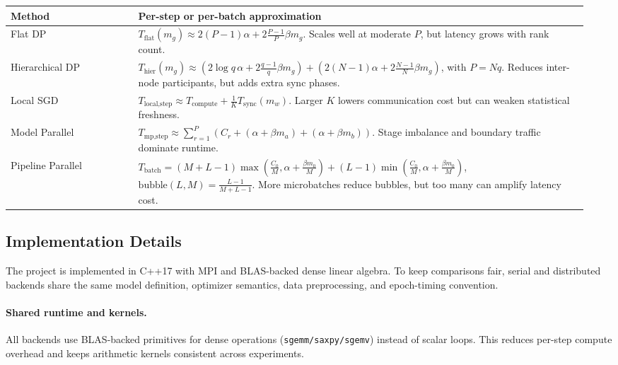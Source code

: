 \documentclass[11pt]{article}
\begin{document}
\begin{center}
\footnotesize
{}
\label{tab:alpha-beta-summary}
\begin{tabular}{p{0.21\linewidth}p{0.74\linewidth}}
\toprule
\textbf{Method} & \textbf{Per-step or per-batch approximation} \\
\midrule
Flat DP &
\(T_{\text{flat}}(m_g) \approx 2(P-1)\alpha + 2\frac{P-1}{P}\beta m_g\). Scales well at moderate \(P\), but latency grows with rank count. \\
Hierarchical DP &
\(T_{\text{hier}}(m_g) \approx \left(2\log q\,\alpha + 2\frac{q-1}{q}\beta m_g\right) + \left(2(N-1)\alpha + 2\frac{N-1}{N}\beta m_g\right)\), with \(P=Nq\). Reduces inter-node participants, but adds extra sync phases. \\
Local SGD &
\(T_{\text{local,step}} \approx T_{\text{compute}} + \frac{1}{K}T_{\text{sync}}(m_w)\). Larger \(K\) lowers communication cost but can weaken statistical freshness. \\
Model Parallel &
\(T_{\text{mp,step}} \approx \sum_{r=1}^{P}\left(C_r + (\alpha+\beta m_a) + (\alpha+\beta m_b)\right)\). Stage imbalance and boundary traffic dominate runtime. \\
Pipeline Parallel &
\(T_{\text{batch}} = (M + L - 1)\max\!\left(\frac{C_0}{M}, \alpha + \frac{\beta m_0}{M}\right) + (L - 1)\min\!\left(\frac{C_0}{M}, \alpha + \frac{\beta m_0}{M}\right)\), \(\text{bubble}(L,M)=\frac{L-1}{M+L-1}\). More microbatches reduce bubbles, but too many can amplify latency cost. \\
\bottomrule
\end{tabular}
\end{center}

\subsection{Implementation Details}
\label{sec:impl}
The project is implemented in C++17 with MPI and BLAS-backed dense linear
algebra. To keep comparisons fair, serial and distributed backends share the
same model definition, optimizer semantics, data preprocessing, and epoch-timing
convention.

\paragraph{Shared runtime and kernels.}
All backends use BLAS-backed primitives for dense operations
(\texttt{sgemm/saxpy/sgemv}) instead of scalar loops. This reduces per-step
compute overhead and keeps arithmetic kernels consistent across experiments.
\end{document}
